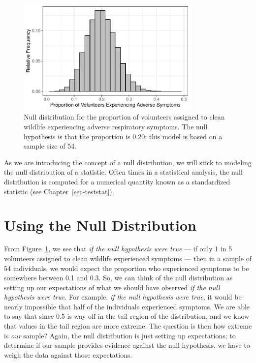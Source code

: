 \documentclass[
  letterpaper,
  DIV=11,
  numbers=noendperiod]{scrreprt}
\theoremstyle{plain}
\theoremstyle{definition}
\theoremstyle{definition}
\theoremstyle{remark}
\begin{document}
\begin{figure}

{\centering \includegraphics[width=0.8\textwidth,height=\textheight]{./images/fig-nulldistns-deepwater-null-1.pdf}

}

\caption{\label{fig-nulldistns-deepwater-null}Null distribution for the
proportion of volunteers assigned to clean wildlife experiencing adverse
respiratory symptoms. The null hypothesis is that the proportion is
0.20; this model is based on a sample size of 54.}

\end{figure}

As we are introducing the concept of a null distribution, we will stick
to modeling the null distribution of a statistic. Often times in a
statistical analysis, the null distribution is computed for a numerical
quantity known as a standardized statistic (see
Chapter~\ref{sec-teststat}).

\hypertarget{using-the-null-distribution}{%
\section{Using the Null
Distribution}\label{using-the-null-distribution}}

From Figure~\ref{fig-nulldistns-deepwater-null}, we see that \emph{if
the null hypothesis were true} --- if only 1 in 5 volunteers assigned to
clean wildlife experienced symptoms --- then in a sample of 54
individuals, we would expect the proportion who experienced symptoms to
be somewhere between 0.1 and 0.3. So, we can think of the null
distribution as setting up our expectations of what we should have
observed \emph{if the null hypothesis were true}. For example, \emph{if
the null hypothesis were true}, it would be nearly impossible that half
of the individuals experienced symptoms. We are able to say that since
0.5 is way off in the tail region of the distribution, and we know that
values in the tail region are more extreme. The question is then how
extreme is \emph{our} sample? Again, the null distribution is just
setting up expectations; to determine if our sample provides evidence
against the null hypothesis, we have to weigh the data against those
expectations.
\end{document}

